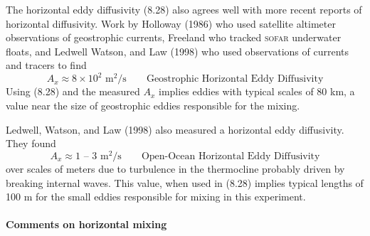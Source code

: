 The horizontal eddy diffusivity (8.28) also agrees well with more
recent reports of horizontal diffusivity. Work by Holloway (1986) who
used satellite altimeter observations of geostrophic
currents,
Freeland who tracked \textsc{sofar} underwater floats, and Ledwell
Watson, and Law (1998) who used observations of currents and tracers
to find
\begin{equation}
A_x \approx 8 \times 10^2 \text{ m$^2$/s} \qquad \text{Geostrophic Horizontal
Eddy Diffusivity}
\end{equation}
Using (8.28) and the measured $A_x$ implies eddies with typical scales
of 80 km, a value near the size of geostrophic
eddies responsible for the mixing.

Ledwell, Watson, and Law (1998) also measured a horizontal eddy
diffusivity. They found
\begin{equation}
A_x \approx 1 \text{ -- } 3 \text{ m$^2$/s} \qquad \text{Open-Ocean Horizontal
Eddy Diffusivity}
\end{equation}
over scales of meters due to turbulence in the
thermocline probably driven by breaking
internal waves. This value, when used in (8.28) implies typical
lengths of 100 m for the small eddies responsible for mixing in this
experiment.

\paragraph{Comments on horizontal mixing}

